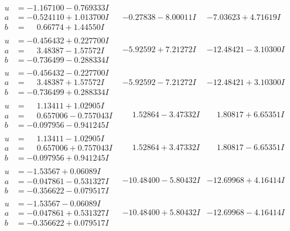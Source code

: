 \documentclass[1p]{elsarticle_modified}
\theoremstyle{definition}
\begin{document}
$$\begin{array}{c|c|c}
\begin{aligned}
u &= -1.167100 - 0.769333 I \\
a &= -0.524110 + 1.013700 I \\
b &= \phantom{-}0.66774 + 1.44550 I\end{aligned}
 & -0.27838 - 8.00011 I & -7.03623 + 4.71619 I \\ \hline\begin{aligned}
u &= -0.456432 + 0.227700 I \\
a &= \phantom{-}3.48387 - 1.57572 I \\
b &= -0.736499 - 0.288334 I\end{aligned}
 & -5.92592 + 7.21272 I & -12.48421 - 3.10300 I \\ \hline\begin{aligned}
u &= -0.456432 - 0.227700 I \\
a &= \phantom{-}3.48387 + 1.57572 I \\
b &= -0.736499 + 0.288334 I\end{aligned}
 & -5.92592 - 7.21272 I & -12.48421 + 3.10300 I \\ \hline\begin{aligned}
u &= \phantom{-}1.13411 + 1.02905 I \\
a &= \phantom{-}0.657006 - 0.757043 I \\
b &= -0.097956 - 0.941245 I\end{aligned}
 & \phantom{-}1.52864 - 3.47332 I & \phantom{-}1.80817 + 6.65351 I \\ \hline\begin{aligned}
u &= \phantom{-}1.13411 - 1.02905 I \\
a &= \phantom{-}0.657006 + 0.757043 I \\
b &= -0.097956 + 0.941245 I\end{aligned}
 & \phantom{-}1.52864 + 3.47332 I & \phantom{-}1.80817 - 6.65351 I \\ \hline\begin{aligned}
u &= -1.53567 + 0.06089 I \\
a &= -0.047861 - 0.531327 I \\
b &= -0.356622 - 0.079517 I\end{aligned}
 & -10.48400 - 5.80432 I & -12.69968 + 4.16414 I \\ \hline\begin{aligned}
u &= -1.53567 - 0.06089 I \\
a &= -0.047861 + 0.531327 I \\
b &= -0.356622 + 0.079517 I\end{aligned}
 & -10.48400 + 5.80432 I & -12.69968 - 4.16414 I \\ \hline\begin{aligned}

\end{aligned}
\end{array}$$
\end{document}
